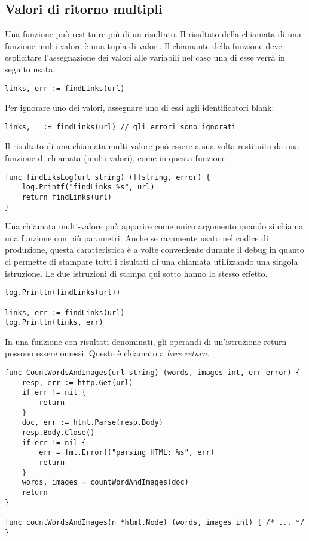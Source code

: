 \documentclass[../../thesis.tex]{subfiles}
\begin{document}
    \subsection{Valori di ritorno multipli}\label{subsec:valori-di-ritorno-multipli}
    Una funzione può restituire più di un risultato.
    Il risultato della chiamata di una funzione multi-valore è una tupla di valori.
    Il chiamante della funzione deve esplicitare l'assegnazione dei valori alle variabili nel caso una di esse verrà in seguito usata.
    \begin{lstlisting}[frame = single, label = {lst:lstlisting4-3.1}]
links, err := findLinks(url)
    \end{lstlisting}
    Per ignorare uno dei valori, assegnare uno di essi agli identificatori blank:
    \begin{lstlisting}[frame = single, label = {lst:lstlisting4-3.2}]
links, _ := findLinks(url) // gli errori sono ignorati
    \end{lstlisting}
    Il risultato di una chiamata multi-valore può essere a sua volta restituito da una funzione di chiamata (multi-valori), come in questa funzione:
    \begin{lstlisting}[frame = single, label = {lst:lstlisting4-3.3}]
func findLiksLog(url string) ([]string, error) {
    log.Printf("findLinks %s", url)
    return findLinks(url)
}
    \end{lstlisting}
    Una chiamata multi-valore può apparire come unico argomento quando si chiama una funzione con più parametri.
    Anche se raramente usato nel codice di produzione, questa caratteristica è a volte conveniente durante il debug in quanto ci permette di stampare tutti i risultati di una chiamata utilizzando una singola istruzione.
    Le due istruzioni di stampa qui sotto hanno lo stesso effetto.
    \begin{lstlisting}[frame = single, label = {lst:lstlisting4-3.4}]
log.Println(findLinks(url))

links, err := findLinks(url)
log.Println(links, err)
    \end{lstlisting}
    In una funzione con risultati denominati, gli operandi di un'istruzione return possono essere omessi.
    Questo è chiamato a \textit{bare return}.
    \begin{lstlisting}[frame = single, label = {lst:lstlisting4-3.5}]
func CountWordsAndImages(url string) (words, images int, err error) {
    resp, err := http.Get(url)
    if err != nil {
        return
    }
    doc, err := html.Parse(resp.Body)
    resp.Body.Close()
    if err != nil {
        err = fmt.Errorf("parsing HTML: %s", err)
        return
    }
    words, images = countWordAndImages(doc)
    return
}

func countWordsAndImages(n *html.Node) (words, images int) { /* ... */ }
    \end{lstlisting}
\end{document}
